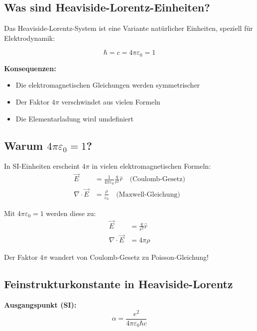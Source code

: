 	\subsection{Was sind Heaviside-Lorentz-Einheiten?}
	
	Das Heaviside-Lorentz-System ist eine Variante natürlicher Einheiten, speziell für Elektrodynamik:
	
	\begin{equation}
		\boxed{\hbar = c = 4\pi\varepsilon_0 = 1}
	\end{equation}
	
	\textbf{Konsequenzen:}
	\begin{itemize}
		\item Die elektromagnetischen Gleichungen werden symmetrischer
		\item Der Faktor $4\pi$ verschwindet aus vielen Formeln
		\item Die Elementarladung wird umdefiniert
	\end{itemize}
	
	\subsection[Warum 4 pi epsilon 0 = 1]{Warum $4\pi\varepsilon_0 = 1$?}
	
	In SI-Einheiten erscheint $4\pi$ in vielen elektromagnetischen Formeln:
	\begin{align}
		\vec{E} &= \frac{1}{4\pi\varepsilon_0} \frac{q}{r^2} \hat{r} \quad \text{(Coulomb-Gesetz)} \\
		\nabla \cdot \vec{E} &= \frac{\rho}{\varepsilon_0} \quad \text{(Maxwell-Gleichung)}
	\end{align}
	
	Mit $4\pi\varepsilon_0 = 1$ werden diese zu:
	\begin{align}
		\vec{E} &= \frac{q}{r^2} \hat{r} \\
		\nabla \cdot \vec{E} &= 4\pi\rho
	\end{align}
	
	Der Faktor $4\pi$ wandert von Coulomb-Gesetz zu Poisson-Gleichung!
	
	\subsection{Feinstrukturkonstante in Heaviside-Lorentz}
	
	\textbf{Ausgangspunkt (SI):}
	\begin{equation}
		\alpha = \frac{e^2}{4\pi\varepsilon_0\hbar c}
	\end{equation}
	
